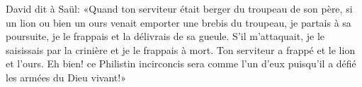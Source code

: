 David dit à Saül: «Quand ton serviteur était berger du troupeau de son père,
	si un lion ou bien un ours venait emporter une brebis du troupeau,
	je partais à sa poursuite, je le frappais et la délivrais de sa gueule.
S’il m’attaquait, je le saisissais par la crinière et je le frappais à mort.
	Ton serviteur a frappé et le lion et l’ours.
Eh bien! ce Philistin incirconcis sera comme l’un d’eux
	puisqu’il a défié les armées du Dieu vivant!»
